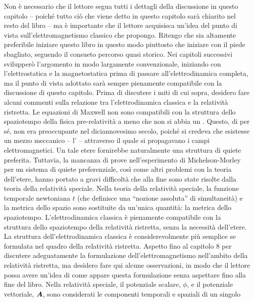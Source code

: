Non è necessario che il lettore segua tutti i dettagli della discussione in questo capitolo -- poiché tutto ciò che viene detto in questo capitolo sarà chiarito nel resto del libro -- ma è importante che il lettore acquisisca un’idea del punto di vista sull’elettromagnetismo classico che propongo. Ritengo che sia altamente preferibile iniziare questo libro in questo modo piuttosto che iniziare con il piede sbagliato, seguendo il consueto percorso quasi storico. Nei capitoli successivi svilupperò l'argomento in modo largamente convenzionale, iniziando con l'elettrostatica e la magnetostatica prima di passare all'elettrodinamica completa, ma il punto di vista adottato sarà sempre pienamente compatibile con la discussione di questo capitolo. Prima di discutere i miti di cui sopra, desidero fare alcuni commenti sulla relazione tra l’elettrodinamica classica e la relatività ristretta. Le equazioni di Maxwell non sono compatibili con la struttura dello spaziotempo della fisica pre-relatività a meno che non si abbia un . Questo, di per sé, non era preoccupante nel diciannovesimo secolo, poiché si credeva che esistesse un mezzo meccanico – l’ – attraverso il quale si propagavano i campi elettromagnetici. Un tale etere fornirebbe naturalmente una struttura di quiete preferita. Tuttavia, la mancanza di prove nell'esperimento di Michelson-Morley per un sistema di quiete preferenziale, così come altri problemi con la teoria dell'etere, hanno portato a gravi difficoltà che alla fine sono state risolte dalla teoria della relatività speciale. Nella teoria della relatività speciale, la funzione temporale newtoniana $t$ (che definisce una “nozione assoluta” di simultaneità) e la metrica dello spazio sono sostituite da un’unica quantità: la metrica dello spaziotempo. L’elettrodinamica classica è pienamente compatibile con la struttura dello spaziotempo della relatività ristretta, senza la necessità dell’etere. La struttura dell'elettrodinamica classica è considerevolmente più semplice se formulata nel quadro della relatività ristretta. Aspetto fino al capitolo 8 per discutere adeguatamente la formulazione dell'elettromagnetismo nell'ambito della relatività ristretta, ma desidero fare qui alcune osservazioni, in modo che il lettore possa avere un'idea di come appare questa formulazione senza aspettare fino alla fine del libro. Nella relatività speciale, il potenziale scalare, $\phi$, e il potenziale vettoriale, $\vb*{A}$, sono considerati le componenti temporali e spaziali di un singolo 
